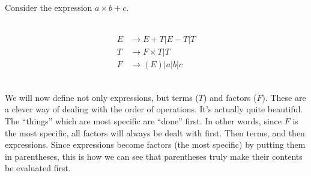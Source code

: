\documentclass{scrartcl}
\begin{document}
Consider the expression $a\times b + c$.\\\ \\
\begin{minipage}{0.45\linewidth}
\begin{center}
\end{center}
\end{minipage}
\begin{minipage}{0.5\linewidth}
\begin{center}
\begin{align*}
E&\rightarrow E+T|E-T|T\\
T&\rightarrow F\times T|T\\
F&\rightarrow (E)|a|b|c
\end{align*}
\end{center}
\end{minipage}

\ \\We will now define not only expressions, but terms ($T$) and factors ($F$). 
These are a clever way of dealing with the order of operations. It's actually quite beautiful.
The ``things'' which are most specific are ``done'' first. In other words, since $F$ is the most specific, all factors will always be dealt with first. Then terms, and then expressions. Since expressions become factors (the most specific) by putting them in parentheses, this is how we can see that parentheses truly make their contents be evaluated first.
\begin{center}
\end{center}
\end{document}
